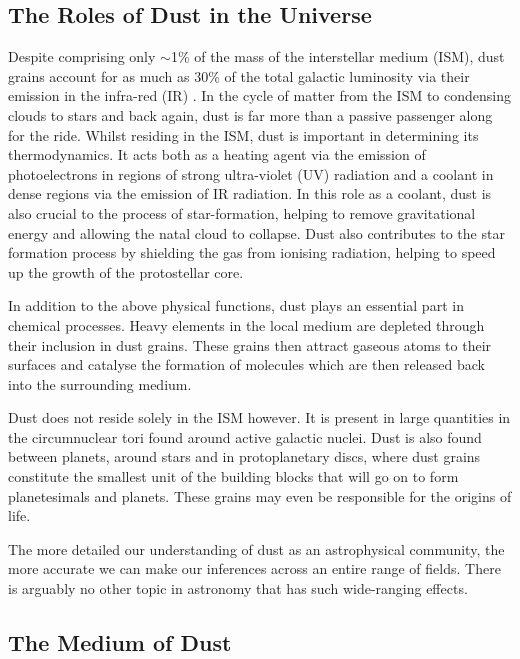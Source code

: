 \subsection{The Roles of Dust in the Universe}

Despite comprising only $\sim$1\% of the mass of the interstellar medium (ISM), dust grains account for as much as 30\% of the total galactic luminosity via their emission in the infra-red (IR) \citep{Li2003}.  In the cycle of matter from the ISM to condensing clouds to stars and back again, dust is far more than a passive passenger along for the ride.  Whilst residing in the ISM, dust is important in determining its thermodynamics.  It acts both as a heating agent via the emission of photoelectrons in regions of strong ultra-violet (UV) radiation and a coolant in dense regions via the emission of IR radiation.  In this role as a coolant, dust is also crucial to the process of star-formation, helping to remove gravitational energy and allowing the natal cloud to collapse.  Dust also contributes to the star formation process by shielding the gas from ionising radiation, helping to speed up the growth of the protostellar core. 

In addition to the above physical functions, dust plays an essential part in chemical processes.  Heavy elements in the local medium are depleted through their inclusion in dust grains.  These grains then attract gaseous atoms to their surfaces and catalyse the formation of molecules which are then released back into the surrounding medium.

Dust does not reside solely in the ISM however.  It is present in  large quantities in the circumnuclear tori found around active galactic nuclei.  Dust is also found between planets, around stars and in protoplanetary discs, where dust grains constitute the smallest unit of the building blocks that will go on to form planetesimals and planets.  These grains may even be responsible for the origins of life.  

The more detailed our understanding of dust as an astrophysical community, the more accurate we can make our inferences across an entire range of  fields.  There is arguably no other topic in astronomy that has such wide-ranging effects.


\subsection{The Medium of Dust}
\label{scn:dust_med}

